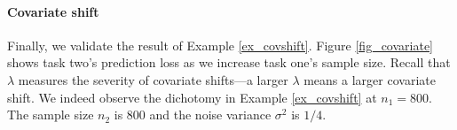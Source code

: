 {\paragraph{Covariate shift}
Finally, we validate the result of Example \ref{ex_covshift}.
Figure \ref{fig_covariate} shows task two's prediction loss as we increase task one's sample size.
Recall that $\lambda$ measures the severity of covariate shifts---a larger $\lambda$ means a larger covariate shift.
We indeed observe the dichotomy in Example \ref{ex_covshift} at $n_1 = 800$.
The sample size $n_2$ is $800$ and the noise variance $\sigma^2$ is $1/4$.



}
